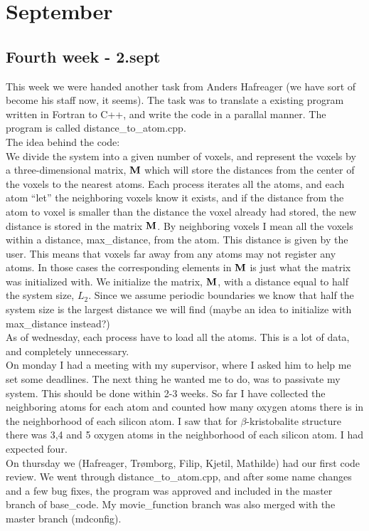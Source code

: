 \chapter{September}

\section{Fourth week - 2.sept}
This week we were handed another task from Anders Hafreager (we have sort of become his staff now, it seems). The task was to translate a existing program written in Fortran to C++, and write the code in a parallal manner. The program is called distance\_to\_atom.cpp. \\
The idea behind the code:\\
We divide the system into a given number of voxels, and represent the voxels by a three-dimensional matrix, $\mathbf{M}$ which will store the distances from the center of the voxels to the nearest atoms. Each process iterates all the atoms, and each atom ``let'' the neighboring voxels know it exists, and if the distance from the atom to voxel is smaller than the distance the voxel already had stored, the new distance is stored in the matrix $\mathbf{M}$. By neighboring voxels I mean all the voxels within a distance, max\_distance, from the atom. This distance is given by the user. This means that voxels far away from any atoms may not register any atoms. In those cases the corresponding elements in $\mathbf{M}$ is just what the matrix was initialized with.
We initialize the matrix, $\mathbf{M}$, with a distance equal to half the system size, $L_2$. Since we assume periodic boundaries we know that half the system size is the largest distance we will find (maybe an idea to initialize with max\_distance instead?)\\
As of wednesday, each process have to load all the atoms. This is a lot of data, and completely unnecessary.\\

On monday I had a meeting with my supervisor, where I asked him to help me set some deadlines. The next thing he wanted me to do, was to passivate my system. This should be done within 2-3 weeks. So far I have collected the neighboring atoms for each atom and counted how many oxygen atoms there is in the neighborhood of each silicon atom. I saw that for $\beta$-kristobalite structure there was 3,4 and 5 oxygen atoms in the neighborhood of each silicon atom. I had expected four.\\
On thursday we (Hafreager, Trømborg, Filip, Kjetil, Mathilde) had our first code review. We went through distance\_to\_atom.cpp, and after some name changes and a few bug fixes, the program was approved and included in the master branch of base\_code. My movie\_function branch was also merged with the master branch (mdconfig).\\

